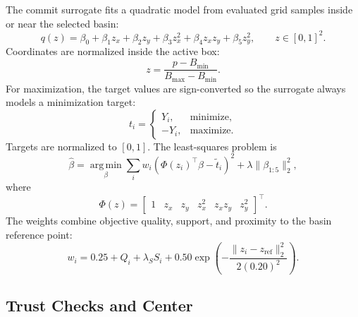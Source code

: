 \documentclass[11pt]{article}
\newcommand{\argmin}{\operatorname*{arg\,min}}
\begin{document}
The commit surrogate fits a quadratic model from evaluated grid samples inside
or near the selected basin:
\begin{equation}
q(z) = \beta_0+\beta_1z_x+\beta_2z_y+\beta_3z_x^2+\beta_4z_xz_y+\beta_5z_y^2,
\qquad z\in[0,1]^2.
\label{eq:commit-quadratic}
\end{equation}
Coordinates are normalized inside the active box:
\begin{equation}
z = \frac{p-B_{\min}}{B_{\max}-B_{\min}}.
\label{eq:normalized-point}
\end{equation}
For maximization, the target values are sign-converted so the surrogate always
models a minimization target:
\begin{equation}
t_i =
\begin{cases}
Y_i, & \text{minimize},\\
-Y_i, & \text{maximize}.
\end{cases}
\label{eq:sign-converted-target}
\end{equation}
Targets are normalized to $[0,1]$. The least-squares problem is
\begin{equation}
\hat\beta
=\argmin_{\beta}
\sum_i w_i\left(\Phi(z_i)^\top\beta-\tilde t_i\right)^2
+\lambda\|\beta_{1:5}\|_2^2,
\label{eq:weighted-ls}
\end{equation}
where
\begin{equation}
\Phi(z)=
\begin{bmatrix}
1 & z_x & z_y & z_x^2 & z_xz_y & z_y^2
\end{bmatrix}^\top.
\label{eq:quadratic-design}
\end{equation}
The weights combine objective quality, support, and proximity to the basin
reference point:
\begin{equation}
w_i = 0.25 + Q_i + \lambda_S S_i
+0.50\exp\left(-\frac{\|z_i-z_{\mathrm{ref}}\|_2^2}{2(0.20)^2}\right).
\label{eq:commit-weights}
\end{equation}

\subsection{Trust Checks and Center}
\end{document}
